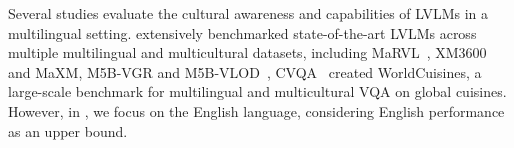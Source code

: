 %
Several studies evaluate the cultural awareness and capabilities of LVLMs in a multilingual setting.
%
\citet{geigle2025centurio} extensively benchmarked state-of-the-art LVLMs across multiple multilingual and multicultural datasets, including MaRVL~\cite{liu2021marvl}, XM3600~\cite{thapliyal_xm3600_2022} and MaXM\cite{changpinyo-etal-2023-maxm}, M5B-VGR and M5B-VLOD~\cite{schneider-sitaram-2024-m5}, CVQA~\cite{romero2024cvqa}
%
\citet{winata2024worldcuisines} created WorldCuisines, a large-scale benchmark for multilingual and multicultural VQA on global cuisines.
%
However, in \dsname, we focus on the English language, considering English performance as an upper bound.
%

